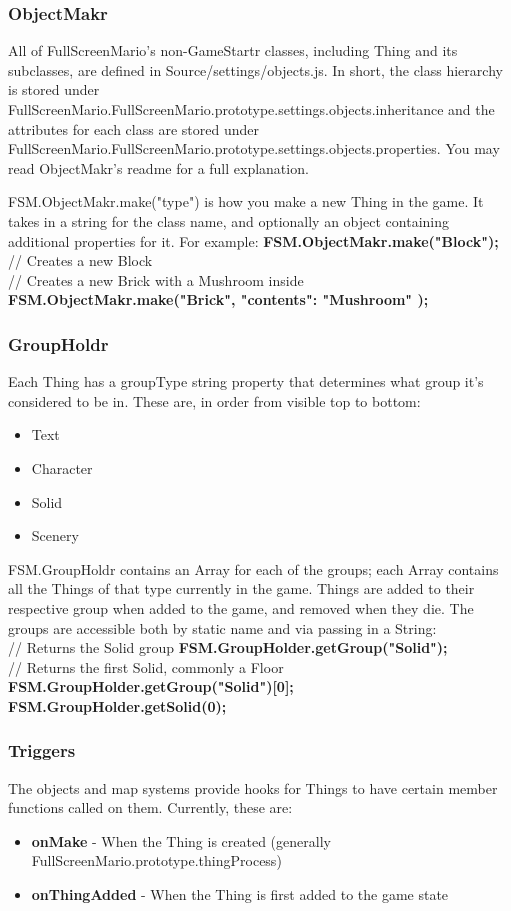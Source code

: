\documentclass{article}
\begin{document}
\subsubsection{ObjectMakr}
All of FullScreenMario's non-GameStartr classes, including Thing and its subclasses, are defined in Source/settings/objects.js. In short, the class hierarchy is stored under FullScreenMario.FullScreenMario.prototype.settings.objects.inheritance and the attributes for each class are stored under FullScreenMario.FullScreenMario.prototype.settings.objects.properties. You may read ObjectMakr's readme for a full explanation.

	FSM.ObjectMakr.make("type") is how you make a new Thing in the game. It takes in a string for the class name, and optionally an object containing additional properties for it. For example:
	\textbf{FSM.ObjectMakr.make("Block");} // Creates a new Block\\
	// Creates a new Brick with a Mushroom inside\\
	\textbf{FSM.ObjectMakr.make("Brick", {
    "contents": "Mushroom"
});}

\subsubsection{GroupHoldr}
Each Thing has a groupType string property that determines what group it's considered to be in. These are, in order from visible top to bottom:\\
\begin{itemize}
\item	Text
\item	Character
\item	Solid
\item	Scenery
\end{itemize}
FSM.GroupHoldr contains an Array for each of the groups; each Array contains all the Things of that type currently in the game. Things are added to their respective group when added to the game, and removed when they die. The groups are accessible both by static name and via passing in a String:\\
	// Returns the Solid group	
	\textbf{FSM.GroupHolder.getGroup("Solid");}\\
	// Returns the first Solid, commonly a Floor
	\textbf{FSM.GroupHolder.getGroup("Solid")[0];\\
FSM.GroupHolder.getSolid(0);}\\

\subsubsection{Triggers}
The objects and map systems provide hooks for Things to have certain member functions called on them. Currently, these are:
	\begin{itemize}
	\item \textbf{onMake} - When the Thing is created (generally FullScreenMario.prototype.thingProcess)
	\item \textbf{onThingAdded} - When the Thing is first added to the game state
	\end{itemize}
\end{document}
